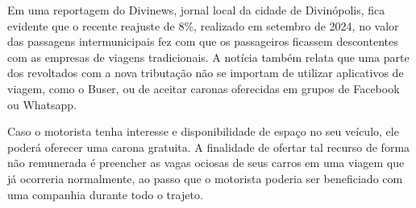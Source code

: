 Em uma reportagem do Divinews, jornal local da cidade de Divinópolis, fica evidente que o recente reajuste de 8\%, realizado em setembro de 2024, no valor das passagens intermunicipais fez com que os passageiros ficassem descontentes  com as empresas de viagens tradicionais. A notícia também relata que uma parte dos revoltados com a nova tributação não se importam de utilizar aplicativos de viagem, como o Buser, ou de aceitar caronas oferecidas em grupos de Facebook ou Whatsapp.

Caso o motorista tenha interesse e disponibilidade de espaço no seu veículo, ele poderá oferecer uma carona gratuita. A finalidade de ofertar tal recurso de forma não remunerada é preencher as vagas ociosas de seus carros em uma viagem que já ocorreria normalmente, ao passo que o motorista poderia ser beneficiado com uma companhia durante todo o trajeto.





